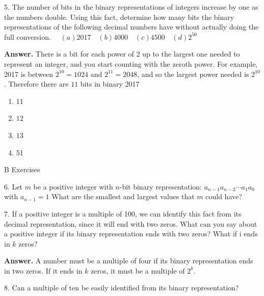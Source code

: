 \documentclass[10pt,]{book}
\theoremstyle{plain}
\theoremstyle{definition}
\theoremstyle{definition}
\theoremstyle{definition}
\theoremstyle{definition}
\begin{document}
\begin{exercisegroup}
\item[5.]\hypertarget{exercise-28}{}The number of bits in the binary representations of integers increase by one as the numbers double.  Using this fact, determine how many bits the binary representations of the following decimal numbers have without actually doing the full conversion. 
\( \quad (a) 2017  \quad (b)  4000   \quad (c) 4500   \quad (d) 2^{50}\)%
\par\smallskip
\par\smallskip
\noindent\textbf{Answer.}\hypertarget{answer-15}{}\quad
There is a bit for each power of 2 up to the largest one needed to represent an integer, and you start counting with the zeroth power. For example, 2017 is between \(2^{10}=1024\) and \(2^{11}=2048\), and so the largest power needed is \(2^{10}\). Therefore there are \(11\) bits in binary 2017%
\par
\leavevmode%
\begin{multicols}{2}
\begin{enumerate}[label=\alph*]
\item\hypertarget{li-206}{} \(11\)%
\item\hypertarget{li-207}{} \(12\)%
\item\hypertarget{li-208}{} \(13\)%
\item\hypertarget{li-209}{} 51%
\end{enumerate}
\end{multicols}
%
\end{exercisegroup}
\par\smallskip\noindent
\hypertarget{exercisegroup-8}{}\typeout{************************************************}
\typeout{************************************************}
B Exercises%
\begin{exercisegroup}
\item[6.]\hypertarget{exercise-29}{}Let \(m\) be a positive integer with \( n\)-bit binary representation: \(a_{n-1}a_{n-2}\cdots  a_1a_0\) with \(a_{n-1}=1\) What are the smallest
and largest values that \(m\) could have? %
\par\smallskip
\item[7.]\hypertarget{exercise-30}{}If a positive integer is a multiple of 100, we can identify this fact from its decimal representation, since it will end with two zeros. What can you say about a positive integer if its binary representation ends with two zeros? What if i ends in \(k\) zeros?%
\par\smallskip
\par\smallskip
\noindent\textbf{Answer.}\hypertarget{answer-16}{}\quad
A number must be a multiple of four if its binary representation ends in two zeros. If it ends in \(k\) zeros, it must be a multiple of \(2^k\).%
\item[8.]\hypertarget{exercise-31}{}Can a multiple of ten be easily identified from its binary representation? %
\par\smallskip
\end{exercisegroup}
\par\smallskip\noindent
\typeout{************************************************}
\typeout{************************************************}
\end{document}

